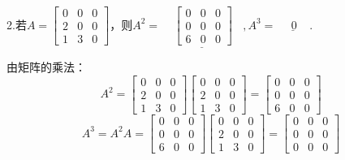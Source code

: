 \documentclass{article}
\begin{document}
  2.若$
  A=
  \begin{bmatrix}
   0&0&0\\
   2&0&0\\
   1&3&0
  \end{bmatrix}
  $，则$A^{2}=\underline{~~~~~  \begin{bmatrix}
   0&0&0\\
   0&0&0\\
   6&0&0
  \end{bmatrix}~~~~},A^{3}=\underline{~~~~~~0~~~~~}$.

\begin{jie}
由矩阵的乘法：
\begin{equation*}
 A^{2}= \begin{bmatrix}
   0&0&0\\
   2&0&0\\
   1&3&0
  \end{bmatrix}  \begin{bmatrix}
   0&0&0\\
   2&0&0\\
   1&3&0
  \end{bmatrix}=
    \begin{bmatrix}
   0&0&0\\
   0&0&0\\
   6&0&0
  \end{bmatrix}
\end{equation*}
\begin{equation*}
 A^{3}=A^{2}A=    \begin{bmatrix}
   0&0&0\\
   0&0&0\\
   6&0&0
  \end{bmatrix}  \begin{bmatrix}
   0&0&0\\
   2&0&0\\
   1&3&0
  \end{bmatrix}=
    \begin{bmatrix}
   0&0&0\\
   0&0&0\\
   0&0&0
  \end{bmatrix}
\end{equation*}


\end{jie}
\end{document}
